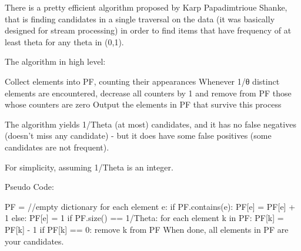 

There is a pretty efficient algorithm proposed by Karp Papadimtrioue Shanke, that is finding candidates in a single traversal on the data (it was basically designed for stream processing) in order to find items that have frequency of at least theta for any theta in (0,1).

The algorithm in high level:

    Collect elements into PF, counting their appearances
    Whenever 1/θ distinct elements are encountered, decrease all counters by 1 and remove from PF those whose counters are zero
    Output the elements in PF that survive this process

The algorithm yields 1/Theta (at most) candidates, and it has no false negatives (doesn't miss any candidate) - but it does have some false positives (some candidates are not frequent).

For simplicity, assuming 1/Theta is an integer.

Pseudo Code:

PF = {} //empty dictionary
for each element e:
   if PF.contains(e):
       PF[e] = PF[e] + 1
   else:
       PF[e] = 1
       if PF.size() == 1/Theta:
             for each element k in PF:
                PF[k] = PF[k] - 1
                if PF[k] == 0:
                     remove k from PF
When done, all elements in PF are your candidates.

